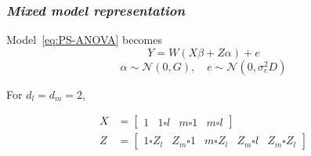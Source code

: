 \documentclass[12pt]{beamer}
\newcommand{\ms}{\scriptscriptstyle}
\begin{document}
\begin{frame}
\frametitle{\emph{Mixed model representation}}


Model~\ref{eq:PS-ANOVA} becomes
\begin{equation} \label{eq:vc-mixed-effects-model}
Y = W\left(X \beta + Z \alpha\right) + e 
\end{equation}
\begin{equation*}
 \alpha \sim \mathcal{N}\left(0,G \right), \quad
 e\sim\mathcal{N}\left(0, \sigma_{\ms e}^2 D \right)
\end{equation*}

For $d_{\ms l} = d_{\ms m} = 2$, 

\begin{align*} 
X &= \left[\begin{array}{c|c|c|c} 1 & 1 \square l & m \square 1 & m \square l  \end{array} \right] \\
Z &= \left[\begin{array}{c|c|c|c|c} 1 \square Z_{\ms l}& Z_{\ms m} \square 1 & m \square  Z_{\ms l} &  Z_{\ms m} \square l &  Z_{\ms m} \square  Z_{\ms l}\end{array} \right] 
\end{align*} 

\end{frame}
\end{document}
